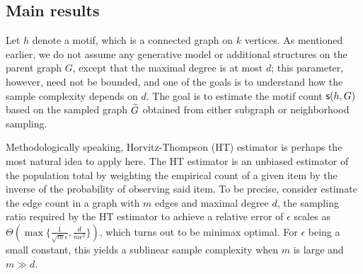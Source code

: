 

\subsection{Main results}

Let $h$ denote a motif, which is a connected graph on $k$ vertices. As mentioned earlier, we do not assume any generative model or additional structures on the parent graph $G$, except that the maximal degree is at most $d$; this parameter, however, need not be bounded, and one of the goals is to understand how the sample complexity depends on $d$. 
The goal is to estimate the motif count $\mathsf{s}(h,G)$ based on the sampled graph ${\widetilde{G}}$ obtained from either subgraph or neighborhood sampling.


Methodologically speaking, Horvitz-Thompson (HT) estimator \cite{HT52} is perhaps the most natural idea to apply here. The HT estimator is an unbiased estimator of the population total by weighting the empirical count of a given item by the inverse of the probability of observing said item. To be precise, consider estimate the edge count in a graph with $m$ edges and maximal degree $d$, the sampling ratio required by the HT estimator to achieve a relative error of $\epsilon$ 
scales as $\Theta(\max\{\frac{1}{\sqrt{m } \epsilon}, \frac{d}{m \epsilon^2} \})$, which turns out to be minimax optimal. 
For $\epsilon$ being a small constant, this yields a sublinear sample complexity when $m$ is large and $m \gg d$. 

